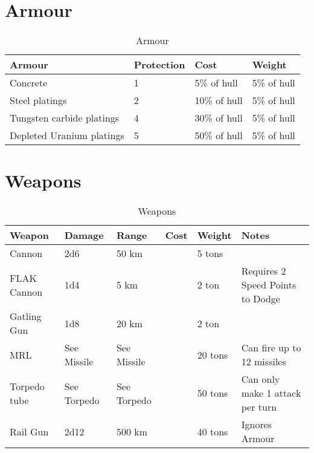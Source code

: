 \section{Armour}
\label{sec:Armour}

\begin{table}[H]
  \centering
  \caption{Armour}
  \label{tab:vessel-armour}
  \begin{tabular}{|l|l|l|l|}
    \hline
    Armour                    & Protection & Cost         & Weight      \\  \hline
    Concrete                  & 1          & 5\% of hull  & 5\% of hull \\ \hline
    Steel platings            & 2          & 10\% of hull & 5\% of hull \\ \hline
    Tungsten carbide platings & 4          & 30\% of hull & 5\% of hull \\ \hline
    Depleted Uranium platings & 5          & 50\% of hull & 5\% of hull \\ \hline
  \end{tabular}
\end{table}

\section{Weapons}
\label{sec:Weapons}

\begin{table}[H]
  \centering
  \caption{Weapons}
  \label{tab:vessel-weapons}
  \begin{tabular}{|l|l|l|l|l|l|}
    \hline
    Weapon       & Damage      & Range       & Cost & Weight  & Notes                            \\ \hline
    Cannon       & 2d6         & 50 km       & ~    & 5 tons  & ~                                \\ \hline
    FLAK Cannon  & 1d4         & 5 km        & ~    & 2 ton   & Requires 2 Speed Points to Dodge \\ \hline
    Gatling Gun  & 1d8         & 20 km       & ~    & 2 ton   & ~      \\ \hline
    MRL          & See Missile & See Missile & ~    & 20 tons & Can fire up to 12 missiles       \\ \hline
    Torpedo tube & See Torpedo & See Torpedo & ~    & 50 tons & Can only make 1 attack per turn  \\ \hline
    Rail Gun     & 2d12     & 500 km      & ~    & 40 tons & Ignores Armour                   \\ \hline
  \end{tabular}
\end{table}

